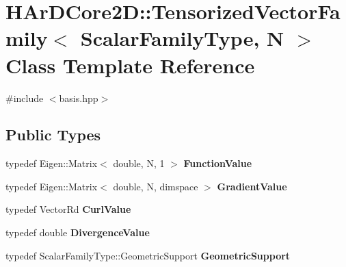 \hypertarget{classHArDCore2D_1_1TensorizedVectorFamily}{}\section{H\+Ar\+D\+Core2D\+:\+:Tensorized\+Vector\+Family$<$ Scalar\+Family\+Type, N $>$ Class Template Reference}
\label{classHArDCore2D_1_1TensorizedVectorFamily}


{\ttfamily \#include $<$basis.\+hpp$>$}

\subsection*{Public Types}
\begin{DoxyCompactItemize}
\item 
\mbox{\label{classHArDCore2D_1_1TensorizedVectorFamily_a55ec3e0805c4dd4a6758a94d04924520}} 
typedef Eigen\+::\+Matrix$<$ double, N, 1 $>$ {\bfseries Function\+Value}
\item 
\mbox{\label{classHArDCore2D_1_1TensorizedVectorFamily_a03e55037df352b512c181687d4526b11}} 
typedef Eigen\+::\+Matrix$<$ double, N, dimspace $>$ {\bfseries Gradient\+Value}
\item 
\mbox{\label{classHArDCore2D_1_1TensorizedVectorFamily_a88c7890d4b589d1e2cbe582445e638bb}} 
typedef Vector\+Rd {\bfseries Curl\+Value}
\item 
\mbox{\label{classHArDCore2D_1_1TensorizedVectorFamily_ab1dda1064d631768943c7658d2e69edd}} 
typedef double {\bfseries Divergence\+Value}
\item 
\mbox{\label{classHArDCore2D_1_1TensorizedVectorFamily_ad1c8c80da131a654a1a91a43e379cc57}} 
typedef Scalar\+Family\+Type\+::\+Geometric\+Support {\bfseries Geometric\+Support}
\end{DoxyCompactItemize}

